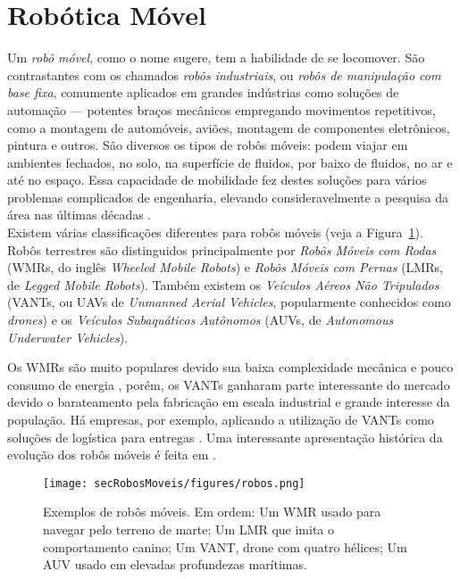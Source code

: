 \section{Robótica Móvel\label{sec:robos}}

Um \textit{robô móvel}, como o nome sugere, tem a habilidade de se locomover. São contrastantes com os chamados \textit{robôs industriais}, ou \textit{robôs de manipulação com base fixa}, comumente aplicados em grandes indústrias como soluções de automação --- potentes braços mecânicos empregando movimentos repetitivos, como a montagem de automóveis, aviões, montagem de componentes eletrônicos, pintura e outros.  São diversos os tipos de robôs móveis: podem viajar em ambientes fechados, no solo, na superfície de fluidos, por baixo de fluidos, no ar e até no espaço. Essa capacidade de mobilidade fez destes soluções para vários problemas complicados de engenharia, elevando consideravelmente a pesquisa da área nas últimas décadas \cite{mobileRobotsCook}.
\\

Existem várias classificações diferentes para robôs móveis \cite{mobileRobotsTzafestas} (veja a Figura~\ref{fig:robosmoveis}). Robôs terrestres são distinguidos principalmente por \textit{Robôs Móveis com Rodas} (WMRs, do inglês \textit{Wheeled Mobile Robots}) e \textit{Robôs Móveis com Pernas} (LMRs, de \textit{Legged Mobile Robots}). Também existem os \textit{Veículos Aéreos Não Tripulados} (VANTs, ou UAVs de \textit{Unmanned Aerial Vehicles}, popularmente conhecidos como \textit{drones}) e os \textit{Veículos Subaquáticos Autônomos} (AUVs, de \textit{Autonomous Underwater Vehicles}). 

Os WMRs são muito populares devido sua baixa complexidade mecânica e pouco consumo de energia \cite{mobileRobotsWheeled}, porém, os VANTs ganharam parte interessante do mercado devido o barateamento pela fabricação em escala industrial e grande interesse da população. Há empresas, por exemplo, aplicando a utilização de VANTs como soluções de logística para entregas \cite{dronesAmazon}. Uma interessante apresentação histórica da evolução dos robôs móveis é feita em \cite{mobileRobotsTzafestas}.

\begin{figure}[H]
	\begin{center}
		\texttt{[image: secRobosMoveis/figures/robos.png]}
	\end{center}
	\caption{Exemplos de robôs móveis. Em ordem: Um WMR usado para navegar pelo terreno de marte; Um LMR que imita o comportamento canino; Um VANT, drone com quatro hélices; Um AUV usado em elevadas profundezas marítimas.}
	\label{fig:robosmoveis}
\end{figure}

